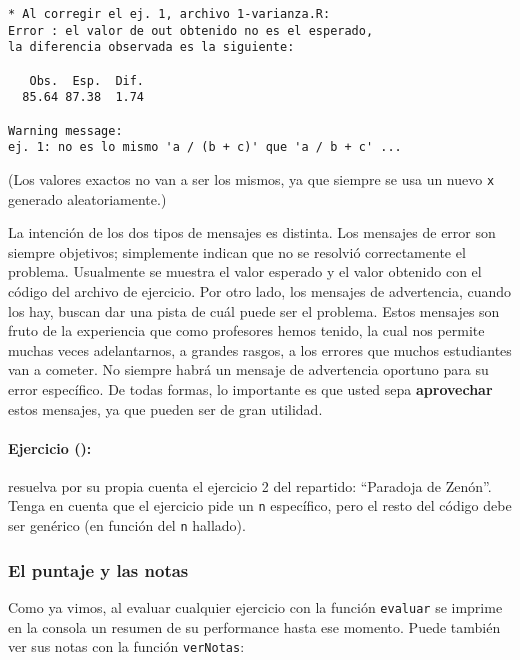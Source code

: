 \documentclass[]{article}
\begin{document}
\begin{verbatim}
* Al corregir el ej. 1, archivo 1-varianza.R:
Error : el valor de out obtenido no es el esperado,
la diferencia observada es la siguiente:

   Obs.  Esp.  Dif. 
  85.64 87.38  1.74

Warning message:
ej. 1: no es lo mismo 'a / (b + c)' que 'a / b + c' ...
\end{verbatim}
(Los valores exactos no van a ser los mismos, ya que siempre se usa un
nuevo \texttt{x} generado aleatoriamente.)

La intención de los dos tipos de mensajes es distinta. Los mensajes de
error son siempre objetivos; simplemente indican que no se resolvió
correctamente el problema. Usualmente se muestra el valor esperado y el
valor obtenido con el código del archivo de ejercicio. Por otro lado,
los mensajes de advertencia, cuando los hay, buscan dar una pista de
cuál puede ser el problema. Estos mensajes son fruto de la experiencia
que como profesores hemos tenido, la cual nos permite muchas veces
adelantarnos, a grandes rasgos, a los errores que muchos estudiantes van
a cometer. No siempre habrá un mensaje de advertencia oportuno para su
error específico. De todas formas, lo importante es que usted sepa
\textbf{aprovechar} estos mensajes, ya que pueden ser de gran utilidad.

\paragraph{Ejercicio ():}

resuelva por su propia cuenta el ejercicio 2 del repartido: ``Paradoja
de Zenón''. Tenga en cuenta que el ejercicio pide un \texttt{n}
específico, pero el resto del código debe ser genérico (en función del
\texttt{n} hallado).

\subsubsection{El puntaje y las notas}

Como ya vimos, al evaluar cualquier ejercicio con la función
\texttt{evaluar} se imprime en la consola un resumen de su performance
hasta ese momento. Puede también ver sus notas con la función
\texttt{verNotas}:
\end{document}
